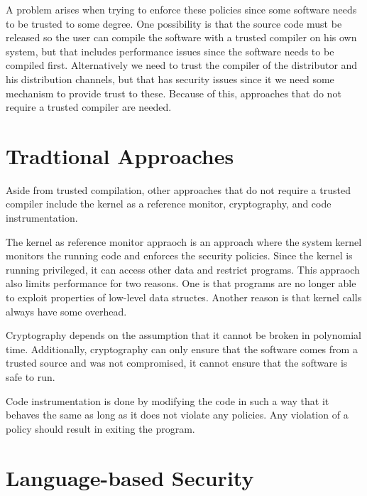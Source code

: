\documentclass[acmlarge]{acmart}
\begin{document}
A problem arises when trying to enforce these policies since some software needs to be trusted to some degree. One possibility is that the source code must be released so the user can compile the software with a trusted compiler on his own system, but that includes performance issues since the software needs to be compiled first. Alternatively we need to trust the compiler of the distributor and his distribution channels, but that has security issues since it we need some mechanism to provide trust to these. Because of this, approaches that do not require a trusted compiler are needed.

\section{Tradtional Approaches}

Aside from trusted compilation, other approaches that do not require a trusted compiler include the kernel as a reference monitor, cryptography, and code instrumentation.

The kernel as reference monitor appraoch is an approach where the system kernel monitors the running code and enforces the security policies. Since the kernel is running privileged, it can access other data and restrict programs. This appraoch also limits performance for two reasons. One is that programs are no longer able to exploit properties of low-level data structes. Another reason is that kernel calls always have some overhead.

Cryptography depends on the assumption that it cannot be broken in polynomial time. Additionally, cryptography can only ensure that the software comes from a trusted source and was not compromised, it cannot ensure that the software is safe to run.

Code instrumentation is done by modifying the code in such a way that it behaves the same as long as it does not violate any policies. Any violation of a policy should result in exiting the program.

\section{Language-based Security}








\end{document}
